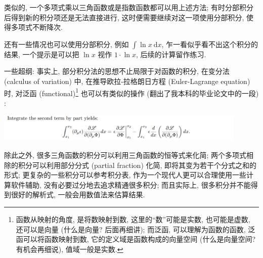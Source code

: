 \begin{tcolorbox}[size=fbox, breakable, enhanced jigsaw, title={分部积分法 (integration by parts)}]
\begin{newquote}
类似的, 一个多项式乘以三角函数或是指数函数都可以用上述方法;
有时分部积分后得到新的积分项还是无法直接进行,
这时便需要继续对这一项使用分部积分, 使得多项式不断降次.

还有一些情况也可以使用分部积分, 例如 \(\int\ln x\ \mathrm{d}x\),
乍一看似乎看不出这个积分的结果, 一个提示是可以把 \(\ln x\) 视作
\(1\cdot\ln x\), 后续的计算留作练习.
\end{newquote}

一些超纲: 事实上, 部分积分法的思想不止局限于对函数的积分, 在变分法
(calculus of variation) 中, 在推导欧拉-拉格朗日方程 (Euler-Lagrange
equation) 时, 对泛函 (functional)\footnote{函数从映射的角度,
  是将数映射到数, 这里的``数''可能是实数, 也可能是虚数, 还可以是向量
  (什么是向量? 后面再细讲); 而泛函, 可以理解为函数的函数,
  泛函可以将函数映射到数, 它的定义域是函数构成的向量空间
  (什么是向量空间? 有机会再细说), 值域一般是实数.} 也可以有类似的操作
(翻出了我本科的毕业论文中的一段) :

\begin{tcolorbox}[size=fbox, breakable, enhanced jigsaw]
  \includegraphics[width=0.9\textwidth]{img/image-20231101180718605.png}
\end{tcolorbox}

除此之外, 很多三角函数的积分可以利用三角函数的恒等式来化简;
两个多项式相除的积分可以利用部分分式 (partial fraction) 化简,
即将其变为若干个分式之和的形式; 更复杂的一些积分可以参考积分表,
作为一个现代人更可以合理使用一些计算软件辅助,
没有必要过分地去追求精通很多积分; 而且实际上,
很多积分并不能得到很好的解析式, 一般会用数值法来估算结果.
\end{tcolorbox}